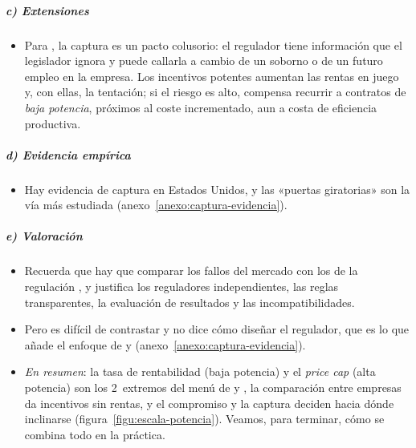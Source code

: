 \documentclass[11pt]{article}
\begin{document}
\subparagraph{c) Extensiones}

\begin{itemize}
\item Para \textcite{LaffontTirole1991Politics}, la captura es un pacto colusorio: el regulador tiene información que el legislador ignora y puede callarla a cambio de un soborno o de un futuro empleo en la empresa. Los incentivos potentes aumentan las rentas en juego y, con ellas, la tentación; si el riesgo es alto, compensa recurrir a contratos de \emph{baja potencia}, próximos al coste incrementado, aun a costa de eficiencia productiva.
\end{itemize}

\subparagraph{d) Evidencia empírica}

\begin{itemize}
\item Hay evidencia de captura en Estados Unidos\nocite{Stigler1971Theory}, y las «puertas giratorias» son la vía más estudiada\nocite{DalBo2006Regulatory} (anexo~\ref{anexo:captura-evidencia}).
\end{itemize}

\subparagraph{e) Valoración}

\begin{itemize}
\item Recuerda que hay que comparar los fallos del mercado con los de la regulación , y justifica los reguladores independientes, las reglas transparentes, la evaluación de resultados y las incompatibilidades.
\item Pero es difícil de contrastar y no dice cómo diseñar el regulador, que es lo que añade el enfoque de  y  (anexo~\ref{anexo:captura-evidencia}).
\item \emph{En resumen}: la tasa de rentabilidad (baja potencia) y el \emph{price cap} (alta potencia) son los 2~extremos del menú de  y , la comparación entre empresas da incentivos sin rentas, y el compromiso y la captura deciden hacia dónde inclinarse (figura~\ref{figu:escala-potencia}). Veamos, para terminar, cómo se combina todo en la práctica.
\end{itemize}

\begin{infografia}[H]
\centering
\caption{Escala de la potencia de los incentivos: cada instrumento en su lugar, entre más incentivos y más rentas}\label{figu:escala-potencia}
\end{infografia}
\end{document}
